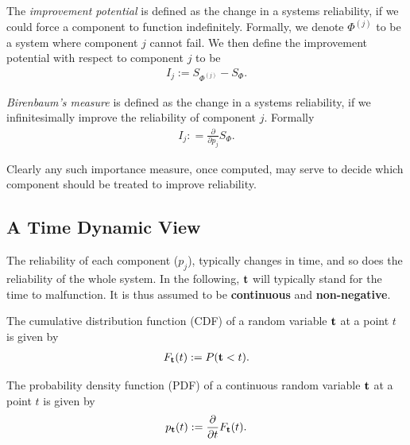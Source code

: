 \begin{definition}
The \emph{improvement potential} is defined as the change in a systems reliability, if we could force a component to function indefinitely.
Formally, we denote $\Phi^{(j)}$ to be a system where component $j$ cannot fail. 
We then define the improvement potential with respect to component $j$ to be 
\begin{align}
	I_j :=S_{\Phi^{(j)}}-S_{\Phi}.
\end{align}
\end{definition}



\begin{definition}
\emph{Birenbaum's measure} is defined as the change in a systems reliability, if we infinitesimally improve the reliability of component $j$.
Formally 
\begin{align}
	I_j: =\frac{\partial}{\partial p_j} S_{\Phi}.
\end{align}
\end{definition}


Clearly any such importance measure, once computed, may serve to decide which component should be treated to improve reliability.







\subsection{A Time Dynamic View}
The reliability of each component ($p_j$), typically changes in time, and so does the reliability of the whole system.
In the following, $\mathbf{t}$ will typically stand for the time to malfunction. It is thus assumed to be \textbf{continuous} and \textbf{non-negative}.


\begin{definition}[CDF]
The cumulative distribution function (CDF) of a random variable $\mathbf{t}$ at a point $t$  is given by
\begin{align}
	F_{\mathbf{t}} (t):= P(\mathbf{t}<t).
\end{align}
\end{definition}

\begin{definition}[PDF]
The probability density function (PDF) of a continuous random variable $\mathbf{t}$ at a point $t$ is given by 
\begin{align}
	p_{\mathbf{t}} (t):= \frac{\partial}{\partial t}F_{\mathbf{t}} (t).
\end{align}
\end{definition}


